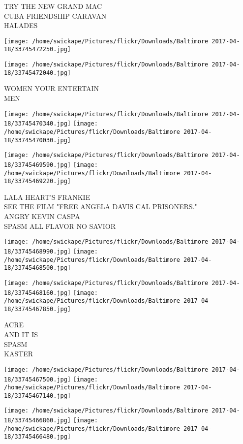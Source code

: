 \documentclass[10pt,letterpaper]{article}
\begin{document}
TRY THE NEW GRAND MAC\\
CUBA FRIENDSHIP CARAVAN\\
HALADES
\pagebreak

\texttt{[image: /home/swickape/Pictures/flickr/Downloads/Baltimore 2017-04-18/33745472250.jpg]}

\vspace{0.25in}
\texttt{[image: /home/swickape/Pictures/flickr/Downloads/Baltimore 2017-04-18/33745472040.jpg]}

WOMEN YOUR ENTERTAIN\\
MEN
\pagebreak

\texttt{[image: /home/swickape/Pictures/flickr/Downloads/Baltimore 2017-04-18/33745470340.jpg]}
\texttt{[image: /home/swickape/Pictures/flickr/Downloads/Baltimore 2017-04-18/33745470030.jpg]}

\texttt{[image: /home/swickape/Pictures/flickr/Downloads/Baltimore 2017-04-18/33745469590.jpg]}
\texttt{[image: /home/swickape/Pictures/flickr/Downloads/Baltimore 2017-04-18/33745469220.jpg]}

LALA HEART'S FRANKIE\\
SEE THE FILM "FREE ANGELA DAVIS CAL PRISONERS."\\
ANGRY KEVIN CASPA\\
SPASM ALL FLAVOR NO SAVIOR
\pagebreak

\texttt{[image: /home/swickape/Pictures/flickr/Downloads/Baltimore 2017-04-18/33745468990.jpg]}
\texttt{[image: /home/swickape/Pictures/flickr/Downloads/Baltimore 2017-04-18/33745468500.jpg]}

\texttt{[image: /home/swickape/Pictures/flickr/Downloads/Baltimore 2017-04-18/33745468160.jpg]}
\texttt{[image: /home/swickape/Pictures/flickr/Downloads/Baltimore 2017-04-18/33745467850.jpg]}

ACRE\\
AND IT IS\\
SPASM\\
KASTER
\pagebreak

\texttt{[image: /home/swickape/Pictures/flickr/Downloads/Baltimore 2017-04-18/33745467500.jpg]}
\texttt{[image: /home/swickape/Pictures/flickr/Downloads/Baltimore 2017-04-18/33745467140.jpg]}

\texttt{[image: /home/swickape/Pictures/flickr/Downloads/Baltimore 2017-04-18/33745466860.jpg]}
\texttt{[image: /home/swickape/Pictures/flickr/Downloads/Baltimore 2017-04-18/33745466480.jpg]}
\end{document}
